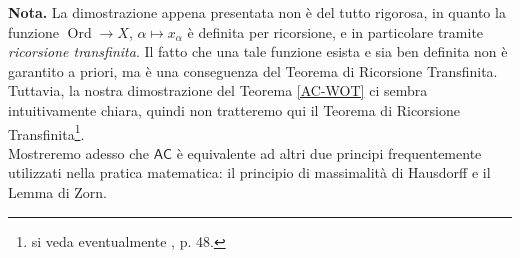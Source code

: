 \documentclass[12pt,a4paper]{report}
\theoremstyle{definition}
\theoremstyle{num.custom-title}
\DeclareMathOperator{\Ord}{\text{Ord}}
\newcommand{\AC}{\ensuremath{\mathsf{AC}}\xspace}
\begin{document}
\noindent\textbf{Nota.} La dimostrazione appena presentata non è del tutto rigorosa, in quanto la funzione $\Ord \to X$, $\alpha \mapsto x_\alpha$ è definita per ricorsione, e in particolare tramite \emph{ricorsione transfinita}. Il fatto che una tale funzione esista e sia ben definita non è garantito a priori, ma è una conseguenza del Teorema di Ricorsione Transfinita. Tuttavia, la nostra dimostrazione del Teorema \ref{AC-WOT} ci sembra intuitivamente chiara, quindi non tratteremo qui il Teorema di Ricorsione Transfinita\footnote{si veda eventualmente \cite{Kunen:logica}, p. 48.}.\\

Mostreremo adesso che \AC è equivalente ad altri due principi frequentemente utilizzati nella pratica matematica: il principio di massimalità di Hausdorff e il Lemma di Zorn.
\end{document}
